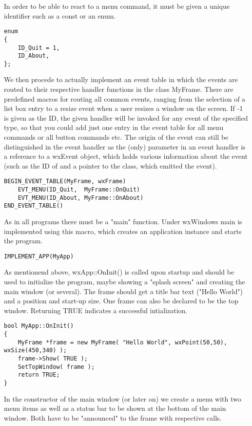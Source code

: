 In order to be able to react to a menu command, it must be given a unique
identifier such as a const or an enum.

\begin{verbatim}
enum
{
    ID_Quit = 1,
    ID_About,
};
\end{verbatim}

We then procede to actually implement an event table in which the events
are routed to their respective handler functions in the class MyFrame.
There are predefined macros for routing all common events, ranging from
the selection of a list box entry to a resize event when a user resizes
a window on the screen. If -1 is given as the ID, the given handler will be
invoked for any event of the specified type, so that you could add just
one entry in the event table for all menu commands or all button commands etc.
The origin of the event can still be distinguished in the event handler as
the (only) parameter in an event handler is a reference to a wxEvent object,
which holds various information about the event (such as the ID of and a
pointer to the class, which emitted the event).

\begin{verbatim}
BEGIN_EVENT_TABLE(MyFrame, wxFrame)
    EVT_MENU(ID_Quit,  MyFrame::OnQuit)
    EVT_MENU(ID_About, MyFrame::OnAbout)
END_EVENT_TABLE()
\end{verbatim}

As in all programs there must be a "main" function. Under wxWindows main is implemented
using this macro, which creates an application instance and starts the program.

\begin{verbatim}
IMPLEMENT_APP(MyApp)
\end{verbatim}

As mentionend above, wxApp::OnInit() is called upon startup and should be
used to initialize the program, maybe showing a "splash screen" and creating
the main window (or several). The frame should get a title bar text ("Hello World")
and a position and start-up size. One frame can also be declared to be the
top window. Returning TRUE indicates a successful intialization.

\begin{verbatim}
bool MyApp::OnInit()
{
    MyFrame *frame = new MyFrame( "Hello World", wxPoint(50,50), wxSize(450,340) );
    frame->Show( TRUE );
    SetTopWindow( frame );
    return TRUE;
}
\end{verbatim}

In the constructor of the main window (or later on) we create a menu with two menu 
items as well as a status bar to be shown at the bottom of the main window. Both have 
to be "announced" to the frame with respective calls.

